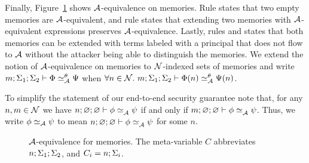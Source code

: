 Finally, Figure~\ref{fig:low-eq-memories} shows $\mathcal{A}$-equivalence on memories. Rule  states that two empty memories are $\mathcal{A}$-equivalent, and rule  states that extending two memories with $\mathcal{A}$-equivalent expressions preserves $\mathcal{A}$-equivalence. Lastly, rules  and  states that both memories can be extended with terms labeled with a principal that does not flow to $\mathcal{A}$ without the attacker being able to distinguish the memories. We extend the notion of $\mathcal{A}$-equivalence on memories to $\mathcal{N}$-indexed sets of memories and write $\loweq{m; \env_1; \env_2}{\Attacker}[\bijection]{\globalstore}{\altglobalstore}$ when $\forall n \in \Nameset.~\loweq{m; \env_1; \env_2}{\Attacker}[\bijection]{\globalstore(n)}{\altglobalstore(n)}$.

To simplify the statement of our end-to-end security guarantee note that, for any $n, m \in \mathcal{N}$ we have $\loweq{n; \emptyenv; \emptyenv}{\Attacker}{\store}{\altstore}$ if and only if $\loweq{m; \emptyenv; \emptyenv}{\Attacker}{\store}{\altstore}$. Thus, we write $\phi \simeq_{\mathcal{A}} \psi$ to mean $\loweq{n; \emptyenv; \emptyenv}{\Attacker}{\store}{\altstore}$ for some $n$.

\begin{figure}
    \centering
    \caption{$\mathcal{A}$-equivalence for memories. The meta-variable $C$ abbreviates $n; \Sigma_1; \Sigma_2$, and $C_i = n; \Sigma_i$.}
    \label{fig:low-eq-memories}
\end{figure}

